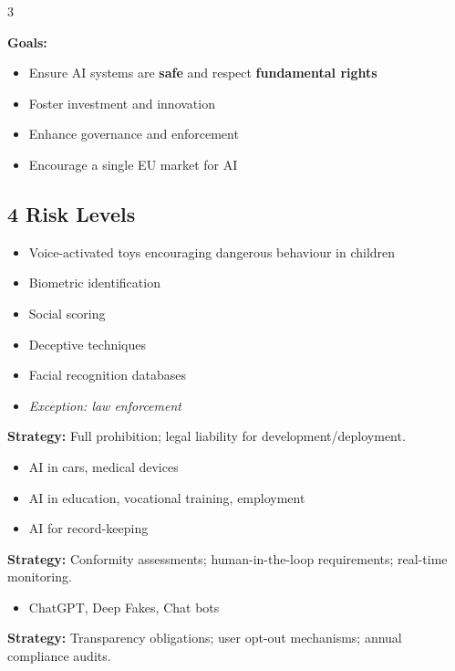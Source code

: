 \documentclass[a4paper,7pt]{extarticle}
\begin{document}
\begin{multicols}{3}
\begin{infobox}
\textbf{Goals:}
\begin{itemize}
  \item Ensure AI systems are \textbf{safe} and respect \textbf{fundamental rights}
  \item Foster investment and innovation
  \item Enhance governance and enforcement
  \item Encourage a single EU market for AI
\end{itemize}
\end{infobox}

\subsection{4 Risk Levels}

\begin{warnbox}
\begin{itemize}
  \item Voice-activated toys encouraging dangerous behaviour in children
  \item Biometric identification
  \item Social scoring
  \item Deceptive techniques
  \item Facial recognition databases
  \item \textit{Exception: law enforcement}
\end{itemize}
\textbf{Strategy:} Full prohibition; legal liability for development/deployment.
\end{warnbox}

\begin{warnbox}
\begin{itemize}
  \item AI in cars, medical devices
  \item AI in education, vocational training, employment
  \item AI for record-keeping
\end{itemize}
\textbf{Strategy:} Conformity assessments; human-in-the-loop requirements; real-time monitoring.
\end{warnbox}

\begin{infobox}
\begin{itemize}
  \item ChatGPT, Deep Fakes, Chat bots
\end{itemize}
\textbf{Strategy:} Transparency obligations; user opt-out mechanisms; annual compliance audits.
\end{infobox}


\end{multicols}
\end{document}
